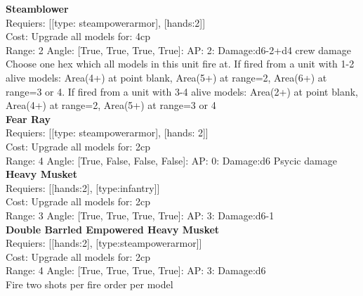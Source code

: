 {\bf Steamblower } \\

Requiers: [[type: steampowerarmor], [hands:2]] \\
Cost: Upgrade all models for: 4cp \\


Range: 2  Angle: [True, True, True, True]: AP: 2: Damage:d6-2+d4 crew damage \\
Choose one hex which all models in this unit fire at. If fired from a unit with 1-2 alive models: Area(4+) at point blank, Area(5+) at range=2, Area(6+) at range=3 or 4. If fired from a unit with 3-4 alive models: Area(2+) at point blank, Area(4+) at range=2, Area(5+) at range=3 or 4\\ 






{\bf Fear Ray } \\

Requiers: [[type: steampowerarmor], [hands: 2]] \\
Cost: Upgrade all models for: 2cp \\


Range: 4  Angle: [True, False, False, False]: AP: 0: Damage:d6 Psycic damage \\






{\bf Heavy Musket } \\

Requiers: [[hands:2], [type:infantry]] \\
Cost: Upgrade all models for: 2cp \\


Range: 3  Angle: [True, True, True, True]: AP: 3: Damage:d6-1 \\






{\bf Double Barrled Empowered Heavy Musket } \\

Requiers: [[hands:2], [type:steampowerarmor]] \\
Cost: Upgrade all models for: 2cp \\


Range: 4  Angle: [True, True, True, True]: AP: 3: Damage:d6 \\
Fire two shots per fire order per model\\ 






